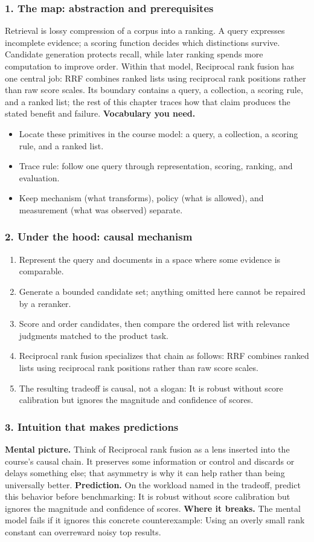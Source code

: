 \subsubsection*{1. The map: abstraction and prerequisites}
Retrieval is lossy compression of a corpus into a ranking. A query expresses incomplete evidence; a scoring function decides which distinctions survive. Candidate generation protects recall, while later ranking spends more computation to improve order.
Within that model, Reciprocal rank fusion has one central job: RRF combines ranked lists using reciprocal rank positions rather than raw score scales. Its boundary contains a query, a collection, a scoring rule, and a ranked list; the rest of this chapter traces how that claim produces the stated benefit and failure.
\textbf{Vocabulary you need.}\begin{itemize}
\item Locate these primitives in the course model: a query, a collection, a scoring rule, and a ranked list.
\item Trace rule: follow one query through representation, scoring, ranking, and evaluation.
\item Keep mechanism (what transforms), policy (what is allowed), and measurement (what was observed) separate.
\end{itemize}
\subsubsection*{2. Under the hood: causal mechanism}\begin{enumerate}
\item Represent the query and documents in a space where some evidence is comparable.
\item Generate a bounded candidate set; anything omitted here cannot be repaired by a reranker.
\item Score and order candidates, then compare the ordered list with relevance judgments matched to the product task.
\item Reciprocal rank fusion specializes that chain as follows: RRF combines ranked lists using reciprocal rank positions rather than raw score scales.
\item The resulting tradeoff is causal, not a slogan: It is robust without score calibration but ignores the magnitude and confidence of scores.
\end{enumerate}
\subsubsection*{3. Intuition that makes predictions}
\textbf{Mental picture.} Think of Reciprocal rank fusion as a lens inserted into the course's causal chain. It preserves some information or control and discards or delays something else; that asymmetry is why it can help rather than being universally better.
\textbf{Prediction.} On the workload named in the tradeoff, predict this behavior before benchmarking: It is robust without score calibration but ignores the magnitude and confidence of scores.
\textbf{Where it breaks.} The mental model fails if it ignores this concrete counterexample: Using an overly small rank constant can overreward noisy top results.
